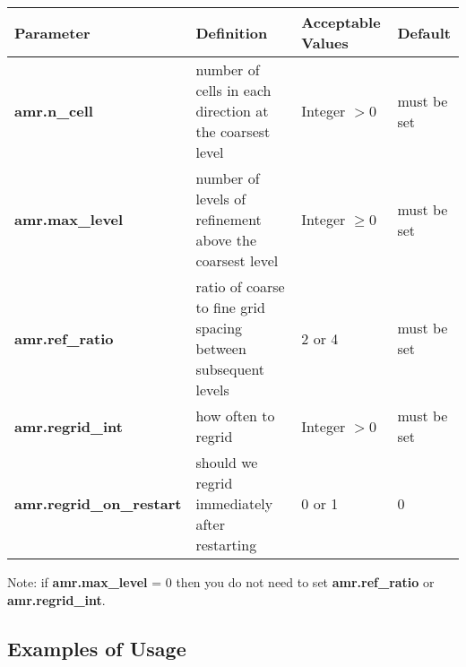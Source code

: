 \begin{table*}[h]
\begin{scriptsize}
\begin{center}
\begin{tabular}{|l|l|l|l|} \hline
Parameter & Definition & Acceptable Values &Default\\
\hline
{\bf amr.n\_cell} &  number of cells in each direction at the coarsest level & Integer $> 0$ & must be set \\
{\bf amr.max\_level} &  number of levels of refinement above the coarsest level& Integer $\geq 0$  & must be set \\
{\bf amr.ref\_ratio} & ratio of coarse to fine grid spacing between subsequent levels & 2 or 4 & must be set \\
{\bf amr.regrid\_int} & how often to regrid & Integer $> 0$  & must be set \\
{\bf amr.regrid\_on\_restart} & should we regrid immediately after restarting & 0 or 1 & 0 \\
\hline
\end{tabular}
\label{Table:ResInputs}
\end{center}
\end{scriptsize}
\end{table*}

\noindent Note: if {\bf amr.max\_level} = 0 then you do not need to set {\bf amr.ref\_ratio} or {\bf amr.regrid\_int}.

\subsection{Examples of Usage}

